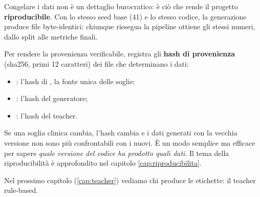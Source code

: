 Congelare i dati non è un dettaglio burocratico: è ciò che rende il progetto
\textbf{riproducibile}. Con lo stesso seed base (41) e lo stesso codice, la
generazione produce file byte-identici: chiunque riesegua la pipeline ottiene
gli stessi numeri, dallo split alle metriche finali.

Per rendere la provenienza verificabile, 
registra gli \textbf{hash di provenienza} (sha256, primi 12 caratteri) dei
file che determinano i dati:

\begin{itemize}
  \item {}: l'hash di , la
        fonte unica delle soglie;
  \item {}: l'hash del generatore;
  \item {}: l'hash del teacher.
\end{itemize}

Se una soglia clinica cambia, l'hash cambia e i dati generati con la vecchia
versione non sono più confrontabili con i nuovi. È un modo semplice ma
efficace per sapere \emph{quale versione del codice ha prodotto quali dati}.
Il tema della riproducibilità è approfondito nel capitolo
\ref{cap:riproducibilita}.

Nel prossimo capitolo (\ref{cap:teacher}) vediamo chi produce le etichette:
il teacher rule-based.